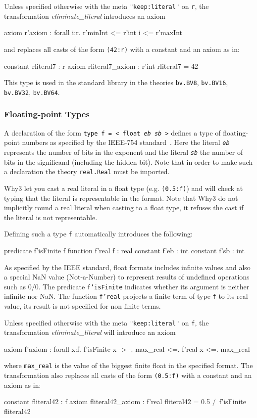 Unless specified otherwise with the meta \texttt{"keep:literal"} on
\texttt{r}, the transformation \emph{eliminate\_literal} introduces an
axiom
\begin{whycode}
axiom r'axiom : forall i:r. r'minInt <= r'int i <= r'maxInt
\end{whycode}
and replaces all casts of the form \texttt{(42:r)} with a constant and
an axiom as in:
\begin{whycode}
constant rliteral7 : r
axiom rliteral7_axiom : r'int rliteral7 = 42
\end{whycode}

This type is used in the standard library in the theories
\texttt{bv.BV8}, \texttt{bv.BV16}, \texttt{bv.BV32}, \texttt{bv.BV64}.


\subsubsection{Floating-point Types}

A declaration of the form \texttt{type f = < float \textit{eb sb} >}
defines a type of floating-point numbers as specified by the IEEE-754
standard~\cite{ieee754-2008}. Here the literal \texttt{\textit{eb}}
represents the number of bits in the exponent and the literal
\texttt{\textit{sb}} the number of bits in the significand (including
the hidden bit). Note that in order to make such a declaration the
theory \texttt{real.Real} must be imported.

Why3 let you cast a real literal in a float type
(e.g. \texttt{(0.5:f)}) and will check at typing that the literal is
representable in the format. Note that Why3 do not implicitly round a
real literal when casting to a float type, it refuses the cast if the
literal is not representable.

Defining such a type \texttt{f} automatically introduces the following:
\begin{whycode}
  predicate f'isFinite f
  function  f'real f : real
  constant  f'eb : int
  constant  f'sb : int
\end{whycode}
As specified by the IEEE standard, float formats includes infinite
values and also a special NaN value (Not-a-Number) to represent
results of undefined operations such as $0/0$.  The predicate
\texttt{f'isFinite} indicates whether its argument is neither infinite
nor NaN. The function \texttt{f'real} projects a finite term of type
\texttt{f} to its real value, its result is not specified for non finite
terms.

Unless specified otherwise with the meta \texttt{"keep:literal"} on
\texttt{f}, the transformation \emph{eliminate\_literal} will
introduce an axiom
\begin{whycode}
axiom f'axiom :
  forall x:f. f'isFinite x -> -. max_real <=. f'real x <=. max_real
\end{whycode}
where \texttt{max\_real} is the value of the biggest finite float in
the specified format. The transformation also replaces all casts of
the form \texttt{(0.5:f)} with a constant and an axiom as in:
\begin{whycode}
constant fliteral42 : f
axiom fliteral42_axiom : f'real fliteral42 = 0.5 /\ f'isFinite fliteral42
\end{whycode}

